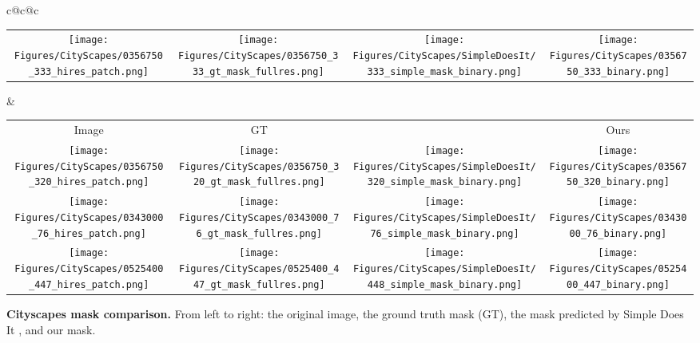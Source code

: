 \documentclass[runningheads]{llncs}
\begin{document}
\begin{tabular}{ c@{\hspace{0.005\textwidth}}c@{\hspace{0.005\textwidth}}c}
\begin{tabular}{ c@{\hspace{0.005\textwidth}}c@{\hspace{0.005\textwidth}}c@{\hspace{0.005\textwidth}}c}
    \texttt{[image: Figures/CityScapes/0356750\_333\_hires\_patch.png]} &
    \texttt{[image: Figures/CityScapes/0356750\_333\_gt\_mask\_fullres.png]} &
    \texttt{[image: Figures/CityScapes/SimpleDoesIt/333\_simple\_mask\_binary.png]} &
    \texttt{[image: Figures/CityScapes/0356750\_333\_binary.png]} \\[-0.25ex]
\end{tabular} &
\begin{tabular}{ c@{\hspace{0.005\textwidth}}c@{\hspace{0.005\textwidth}}c@{\hspace{0.005\textwidth}}c} 
    Image & GT & \cite{khoreva2016simple} & Ours \\
    \texttt{[image: Figures/CityScapes/0356750\_320\_hires\_patch.png]} &
    \texttt{[image: Figures/CityScapes/0356750\_320\_gt\_mask\_fullres.png]} &
    \texttt{[image: Figures/CityScapes/SimpleDoesIt/320\_simple\_mask\_binary.png]} &
    \texttt{[image: Figures/CityScapes/0356750\_320\_binary.png]} \\[-0.37ex]
    
    \texttt{[image: Figures/CityScapes/0343000\_76\_hires\_patch.png]} &
    \texttt{[image: Figures/CityScapes/0343000\_76\_gt\_mask\_fullres.png]} &
    \texttt{[image: Figures/CityScapes/SimpleDoesIt/76\_simple\_mask\_binary.png]} &
    \texttt{[image: Figures/CityScapes/0343000\_76\_binary.png]} \\[-0.37ex]        
    
    \texttt{[image: Figures/CityScapes/0525400\_447\_hires\_patch.png]} &
    \texttt{[image: Figures/CityScapes/0525400\_447\_gt\_mask\_fullres.png]} &
    \texttt{[image: Figures/CityScapes/SimpleDoesIt/448\_simple\_mask\_binary.png]} &
    \texttt{[image: Figures/CityScapes/0525400\_447\_binary.png]} \\[-0.37ex]    
    
\end{tabular}
\end{tabular}
\caption{\textbf{Cityscapes mask comparison.} From left to right: the original image, the ground truth mask (GT), the mask predicted by Simple Does It \cite{khoreva2016simple}, and our mask.}
\end{document}
